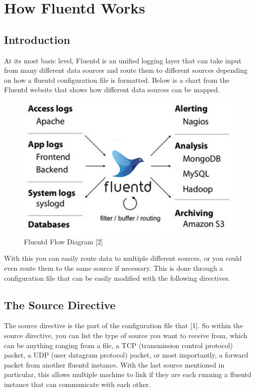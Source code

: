 \documentclass{article}
\begin{document}
\section{How Fluentd Works} \label{sec:works}
\subsection{Introduction}
\quad \quad 
At its most basic level, Fluentd is an unified logging layer that can take input from many different
data sources and route them to different sources depending on how a fluentd configuration file is formatted. Below is a chart
from the Fluentd website that shows how different data sources can be mapped.
\begin{figure}[H]
    \centering
    \includegraphics[scale=0.75]{images/fluentd-architecture.png}
    \caption{Fluentd Flow Diagram [2]}
    \label{fig:pic1}
\end{figure}
With this you can easily route data to multiple different sources, or you could even route them to the same source if necessary.
This is done through a configuration file that can be easily modified with the following directives.
\subsection{The Source Directive}
\quad \quad The source directive is the part of the configuration file that [1]. So within
the source directive, you can list the type of source you want to receive from, which can be anything ranging from a file, a TCP (transmission control protocol) packet,
a UDP (user datagram protocol) packet, or most importantly, a forward packet from another fluentd instance. With the last source mentioned in
particular, this allows multiple machine to link if they are each running a fluentd instance that can communicate with
each other.
\end{document}

